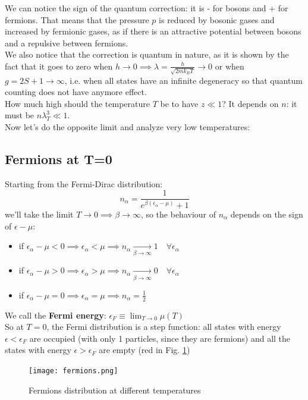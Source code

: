 We can notice the sign of the quantum correction: it is - for bosons and + for fermions. That means that the pressure $p$ is reduced by bosonic gases and increased by fermionic gases, as if there is an attractive potential between bosons and a repulsive between fermions.\\
We also notice that the correction is quantum in nature, as it is shown by the fact that it goes to zero when $h \to 0 \implies \lambda = \frac h{\sqrt{2m k_BT}} \to 0 $ or when $g = 2S +1 \to \infty$, i.e. when all states have an infinite degeneracy so that quantum counting does not have anymore effect.\\

How much high should the temperature $T$ be to have $z \ll 1$? It depends on $n$: it must be \quad $n\lambda_T^3 \ll 1$.\\

Now let's do the opposite limit and analyze very low temperatures:

\subsection{Fermions at T=0}
Starting from the Fermi-Dirac distribution:
$$n_\alpha = \frac 1{e^{\beta(\epsilon_\alpha -\mu)} +1}$$
we'll take the limit $T\to 0 \implies \beta \to \infty$, so the behaviour of $n_\alpha$ depends on the sign of $\epsilon-\mu$:
\begin{itemize}
    \item if $\epsilon_\alpha -\mu < 0 \implies \epsilon_\alpha < \mu \implies n_\alpha \xrightarrow[\beta\to\infty]{}1 \quad \forall \epsilon_\alpha$
    \item if $\epsilon_\alpha -\mu > 0 \implies \epsilon_\alpha > \mu \implies n_\alpha \xrightarrow[\beta\to\infty]{}0 \quad \forall \epsilon_\alpha$
    \item if $\epsilon_\alpha -\mu = 0 \implies \epsilon_\alpha = \mu \implies n_\alpha =\frac12$
\end{itemize}

We call the \textbf{Fermi energy}: $\boxed{\epsilon_F \equiv \lim_{T\to 0}\mu(T)}$\\
So at $T=0$, the Fermi distribution is a step function: all states with energy $\epsilon <\epsilon_F$ are occupied (with only 1 particles, since they are fermions) and all the states with energy $\epsilon > \epsilon_F$ are empty (red in Fig. \ref{fig:fermions})

\begin{figure}[ht]
    \centering
    \texttt{[image: fermions.png]}
    \caption{Fermions distribution at different temperatures}
    \label{fig:fermions}
\end{figure}

